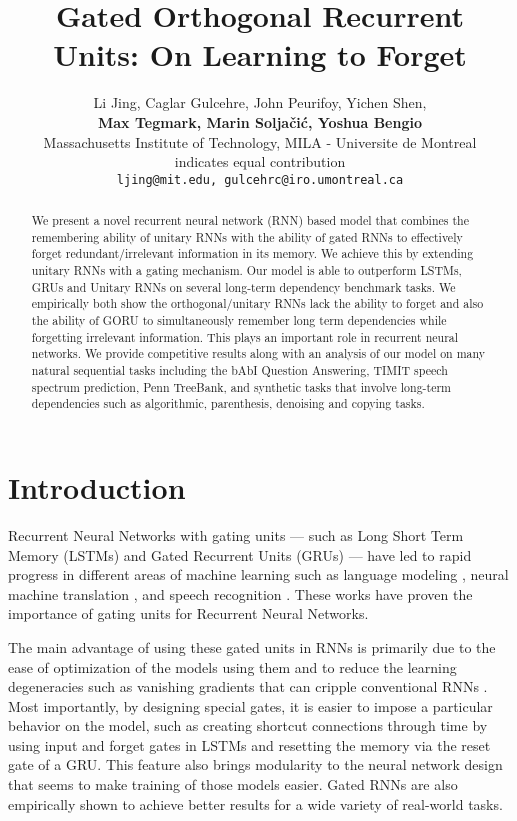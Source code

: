 \documentclass[letterpaper]{article} \usepackage{aaai18}  \usepackage{times}  \usepackage{helvet}  \usepackage{courier}  \usepackage{url}  \usepackage{graphicx}
\title{Gated Orthogonal Recurrent Units: On Learning to Forget}
\author{
Li Jing, Caglar Gulcehre, John Peurifoy, Yichen Shen, \\
{ \bf \Large
  Max Tegmark,  Marin Solja\v{c}i\'{c}, Yoshua Bengio}\\
   Massachusetts Institute of Technology,  
   MILA - Universite de Montreal \\ 
   indicates equal contribution\\
  \texttt{ljing@mit.edu, gulcehrc@iro.umontreal.ca} \\
}
\begin{document}
\maketitle
\begin{abstract}
We present a novel recurrent neural network (RNN) based model that combines the remembering ability of unitary RNNs with the ability of gated RNNs to effectively forget redundant/irrelevant information in its memory.  We achieve this by extending unitary RNNs with a gating mechanism. Our model is able to outperform LSTMs, GRUs and Unitary RNNs on several long-term dependency benchmark tasks. We empirically both show the orthogonal/unitary RNNs lack the ability to forget and also the ability of GORU to simultaneously remember long term dependencies while forgetting irrelevant information. This plays an important role in recurrent neural networks. We provide competitive results along with an analysis of our model on many natural sequential tasks including the bAbI Question Answering, TIMIT speech spectrum prediction, Penn TreeBank, and synthetic tasks that involve long-term dependencies such as algorithmic, parenthesis, denoising and copying tasks.
\end{abstract}


\section{Introduction}





Recurrent Neural Networks with gating units --- such as Long Short Term Memory (LSTMs) \cite{hochreiter1997long,felix2001long} and Gated Recurrent Units (GRUs) \cite{cho2014learning} --- have led to rapid progress in different areas of machine learning such as language modeling \cite{graves2014neural}, neural machine translation \cite{cho2014learning,sutskever2014sequence}, and speech recognition \cite{chan2015listen,chorowski2015attention}. These works have proven the importance of gating units for Recurrent Neural Networks.

The main advantage of using these gated units in RNNs is primarily due to the ease of optimization of the models using them and to reduce the learning degeneracies such as vanishing gradients that can cripple conventional RNNs \cite{pascanu2013difficulty}. Most importantly, by designing special gates, it is easier to impose a particular behavior on the model, such as creating shortcut connections through time by using input and forget gates in LSTMs and resetting the memory via the reset gate of a GRU. This feature also brings modularity to the neural network design that seems to make training of those models easier. Gated RNNs are also empirically shown to achieve better results for a wide variety of real-world tasks.
\end{document}
